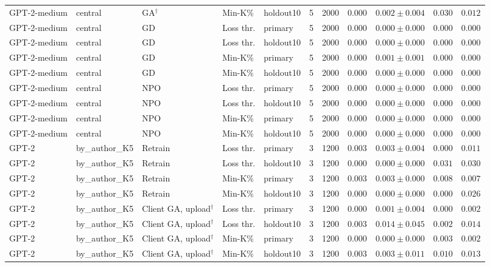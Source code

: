 {\begin{longtable}{@{\extracolsep{\fill}}lllllcccccc@{}}
GPT-2-medium & central & GA$^{\dagger}$ & Min-K\% & holdout10 & 5 & 2000 & $0.000$ & $0.002 \pm 0.004$ & $0.030$ & $0.012$ \\
GPT-2-medium & central & GD & Loss thr. & primary & 5 & 2000 & $0.000$ & $0.000 \pm 0.000$ & $0.000$ & $0.000$ \\
GPT-2-medium & central & GD & Loss thr. & holdout10 & 5 & 2000 & $0.000$ & $0.000 \pm 0.000$ & $0.000$ & $0.000$ \\
GPT-2-medium & central & GD & Min-K\% & primary & 5 & 2000 & $0.000$ & $0.001 \pm 0.001$ & $0.000$ & $0.000$ \\
GPT-2-medium & central & GD & Min-K\% & holdout10 & 5 & 2000 & $0.000$ & $0.000 \pm 0.000$ & $0.000$ & $0.000$ \\
GPT-2-medium & central & NPO & Loss thr. & primary & 5 & 2000 & $0.000$ & $0.000 \pm 0.000$ & $0.000$ & $0.000$ \\
GPT-2-medium & central & NPO & Loss thr. & holdout10 & 5 & 2000 & $0.000$ & $0.000 \pm 0.000$ & $0.000$ & $0.000$ \\
GPT-2-medium & central & NPO & Min-K\% & primary & 5 & 2000 & $0.000$ & $0.000 \pm 0.000$ & $0.000$ & $0.000$ \\
GPT-2-medium & central & NPO & Min-K\% & holdout10 & 5 & 2000 & $0.000$ & $0.000 \pm 0.000$ & $0.000$ & $0.000$ \\
GPT-2 & by\_author\_K5 & Retrain & Loss thr. & primary & 3 & 1200 & $0.003$ & $0.003 \pm 0.004$ & $0.000$ & $0.011$ \\
GPT-2 & by\_author\_K5 & Retrain & Loss thr. & holdout10 & 3 & 1200 & $0.000$ & $0.000 \pm 0.000$ & $0.031$ & $0.030$ \\
GPT-2 & by\_author\_K5 & Retrain & Min-K\% & primary & 3 & 1200 & $0.003$ & $0.003 \pm 0.000$ & $0.008$ & $0.007$ \\
GPT-2 & by\_author\_K5 & Retrain & Min-K\% & holdout10 & 3 & 1200 & $0.000$ & $0.000 \pm 0.000$ & $0.000$ & $0.026$ \\
GPT-2 & by\_author\_K5 & Client GA, upload$^{\dagger}$ & Loss thr. & primary & 3 & 1200 & $0.000$ & $0.001 \pm 0.004$ & $0.000$ & $0.002$ \\
GPT-2 & by\_author\_K5 & Client GA, upload$^{\dagger}$ & Loss thr. & holdout10 & 3 & 1200 & $0.003$ & $0.014 \pm 0.045$ & $0.002$ & $0.014$ \\
GPT-2 & by\_author\_K5 & Client GA, upload$^{\dagger}$ & Min-K\% & primary & 3 & 1200 & $0.000$ & $0.000 \pm 0.000$ & $0.003$ & $0.002$ \\
GPT-2 & by\_author\_K5 & Client GA, upload$^{\dagger}$ & Min-K\% & holdout10 & 3 & 1200 & $0.003$ & $0.003 \pm 0.011$ & $0.010$ & $0.013$ \\

\end{longtable}}
